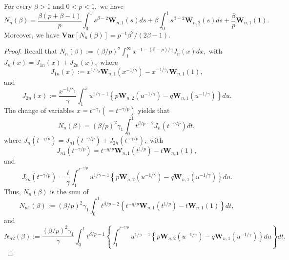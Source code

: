 \documentclass[10pt,a4paper]{amsart}
\begin{document}
\begin{proposition}
\textbf{\label{prop4}}For every $\beta>1$ and $0<p<1,$ we have%
\[
N_{n}\left(  \beta\right)  =\frac{\beta\left(  p+\beta-1\right)  }{p}\int%
_{0}^{1}s^{\beta-2}\mathbf{W}_{n,1}\left(  s\right)  ds+\beta\int_{0}%
^{1}s^{\beta-2}\mathbf{W}_{n,2}\left(  s\right)  ds+\frac{\beta}{p}%
\mathbf{W}_{n,1}\left(  1\right)  .
\]
Moreover, we have $\mathbf{Var}\left[  N_{n}\left(  \beta\right)  \right]
=p^{-1}\beta^{2}/\left(  2\beta-1\right)  .$
\end{proposition}

\begin{proof}
Recall that $N_{n}\left(  \beta\right)  :=\left(  \beta/p\right)  ^{2}\int%
_{1}^{\infty}x^{-1-\left(  \beta-p\right)  /\gamma}J_{n}\left(  x\right)  dx,$
with $J_{n}\left(  x\right)  =J_{1n}\left(  x\right)  +J_{2n}\left(  x\right)
,$ where%
\[
J_{1n}\left(  x\right)  :=x^{1/\gamma_{2}}\mathbf{W}_{n,1}\left(
x^{-1/\gamma}\right)  -x^{-1/\gamma_{1}}\mathbf{W}_{n,1}\left(  1\right)  ,
\]
and
\[
J_{2n}\left(  x\right)  :=\dfrac{x^{-1/\gamma_{1}}}{\gamma}%
{\displaystyle\int_{1}^{x}}
u^{1/\gamma-1}\left\{  p\mathbf{W}_{n,2}\left(  u^{-1/\gamma}\right)
-q\mathbf{W}_{n,1}\left(  u^{-1/\gamma}\right)  \right\}  du.
\]
The change of variables $x=t^{-\gamma_{1}}\left(  =t^{-\gamma/p}\right)  $
yields that%
\[
N_{n}\left(  \beta\right)  =\left(  \beta/p\right)  ^{2}\gamma_{1}\int_{0}%
^{1}t^{\beta/p-2}J_{n}\left(  t^{-\gamma/p}\right)  dt,
\]
where $J_{n}\left(  t^{-\gamma/p}\right)  =J_{n1}\left(  t^{-\gamma/p}\right)
+J_{2n}\left(  t^{-\gamma/p}\right)  ,$ with
\[
J_{n1}\left(  t^{-\gamma/p}\right)  =t^{-q/p}\mathbf{W}_{n,1}\left(
t^{1/p}\right)  -t\mathbf{W}_{n,1}\left(  1\right)  ,
\]
and
\[
J_{2n}\left(  t^{-\gamma/p}\right)  =\dfrac{t}{\gamma}%
{\displaystyle\int_{1}^{t^{-\gamma/p}}}
u^{1/\gamma-1}\left\{  p\mathbf{W}_{n,2}\left(  u^{-1/\gamma}\right)
-q\mathbf{W}_{n,1}\left(  u^{-1/\gamma}\right)  \right\}  du.
\]
Thus, $N_{n}\left(  \beta\right)  $ is the sum of
\[
N_{n1}\left(  \beta\right)  :=\left(  \beta/p\right)  ^{2}\gamma_{1}\int%
_{0}^{1}t^{\beta/p-2}\left\{  t^{-q/p}\mathbf{W}_{n,1}\left(  t^{1/p}\right)
-t\mathbf{W}_{n,1}\left(  1\right)  \right\}  dt,
\]
and%
\[
N_{n2}\left(  \beta\right)  :=\frac{\left(  \beta/p\right)  ^{2}\gamma_{1}%
}{\gamma}\int_{0}^{1}t^{\beta/p-1}\left\{
{\displaystyle\int_{1}^{t^{-\gamma/p}}}
u^{1/\gamma-1}\left\{  p\mathbf{W}_{n,2}\left(  u^{-1/\gamma}\right)
-q\mathbf{W}_{n,1}\left(  u^{-1/\gamma}\right)  \right\}  du\right\}  dt.
\]



\end{proof}
\end{document}
